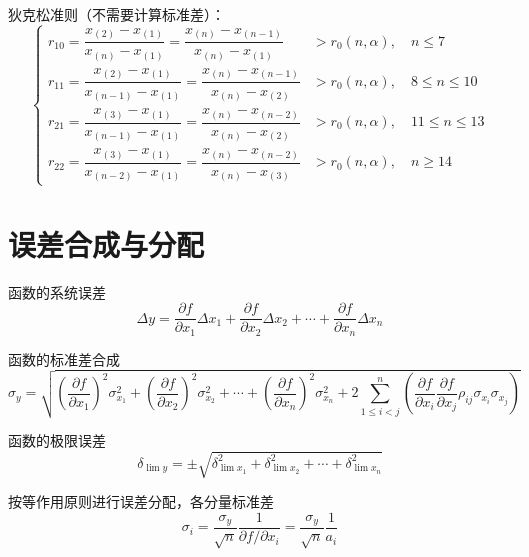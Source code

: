\documentclass[12pt,a4paper]{ctexart}
\begin{document}
狄克松准则（不需要计算标准差）：
\begin{equation*}
\begin{cases}
r_{10}=\dfrac{x_{(2)}-x_{(1)}}{x_{(n)}-x_{(1)}} =\dfrac{x_{(n)}-x_{(n-1)}}{x_{(n)}-x_{(1)}} & > r_0(n,\alpha),\quad n\leq 7 \\[8pt]
r_{11}=\dfrac{x_{(2)}-x_{(1)}}{x_{(n-1)}-x_{(1)}} =\dfrac{x_{(n)}-x_{(n-1)}}{x_{(n)}-x_{(2)}} & > r_0(n,\alpha),\quad 8\leq n\leq 10 \\[8pt]
r_{21}=\dfrac{x_{(3)}-x_{(1)}}{x_{(n-1)}-x_{(1)}} =\dfrac{x_{(n)}-x_{(n-2)}}{x_{(n)}-x_{(2)}} & > r_0(n,\alpha),\quad 11\leq n\leq 13 \\[8pt]
r_{22}=\dfrac{x_{(3)}-x_{(1)}}{x_{(n-2)}-x_{(1)}} =\dfrac{x_{(n)}-x_{(n-2)}}{x_{(n)}-x_{(3)}} & > r_0(n,\alpha),\quad n\geq 14
\end{cases}
\end{equation*}

\section{误差合成与分配}

函数的系统误差
\begin{equation*}
\Delta y = \frac{\partial f}{\partial x_1} \Delta x_1 + \frac{\partial f}{\partial x_2} \Delta x_2 + \cdots + \frac{\partial f}{\partial x_n} \Delta x_n
\end{equation*}

函数的标准差合成
{\small
\begin{equation*}
\sigma_y=
\sqrt{
\left(\frac{\partial f}{\partial x_1}\right)^2 \sigma_{x_1}^2
+
\left(\frac{\partial f}{\partial x_2}\right)^2 \sigma_{x_2}^2
+ \cdots +
\left(\frac{\partial f}{\partial x_n}\right)^2 \sigma_{x_n}^2
+
2 \sum_{1 \le i < j}^{n}
\left(
\frac{\partial f}{\partial x_i}
\frac{\partial f}{\partial x_j}
\rho_{ij}\sigma_{x_i}\sigma_{x_j}
\right)
}
\end{equation*}
}

函数的极限误差
\begin{equation*}
\delta_{\lim y} = \pm \sqrt{\delta_{\lim x_1}^{2}+\delta_{\lim x_2}^{2}+\cdots+\delta_{\lim x_n}^{2}}
\end{equation*}

按等作用原则进行误差分配，各分量标准差
\begin{equation*}
\sigma_i=\frac{\sigma_y}{\sqrt{n}}\frac{1}{\partial f/\partial x_i}
=\frac{\sigma_y}{\sqrt{n}}\frac{1}{a_i}
\end{equation*}
\end{document}
